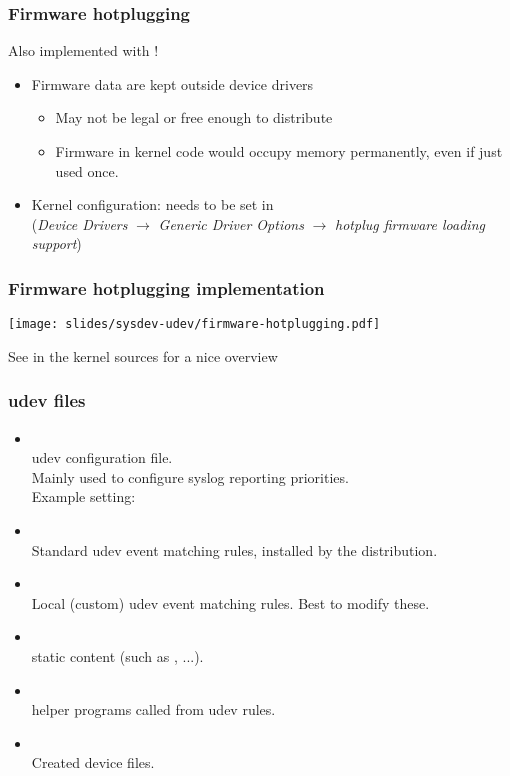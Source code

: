\begin{frame}
  \frametitle{Firmware hotplugging}
  Also implemented with !
  \begin{itemize}
  \item Firmware data are kept outside device drivers
    \begin{itemize}
    \item May not be legal or free enough to distribute
    \item Firmware in kernel code would occupy memory permanently,
      even if just used once.
    \end{itemize}
  \item Kernel configuration: needs to be set in \\
    ({\em Device Drivers} $\rightarrow$ {\em Generic Driver Options}
    $\rightarrow$ {\em hotplug firmware loading support})
  \end{itemize}
\end{frame}

\begin{frame}
  \frametitle{Firmware hotplugging implementation}
  \begin{center}
    \texttt{[image: slides/sysdev-udev/firmware-hotplugging.pdf]}
  \end{center}
  See  in the kernel sources for a
  nice overview
\end{frame}

\begin{frame}
  \frametitle{udev files}
  \begin{itemize}
  \item {}\\
    udev configuration file.\\
    Mainly used to configure syslog reporting priorities.\\
    Example setting: 
  \item {}\\
    Standard udev event matching rules, installed by the distribution.
  \item {}\\
    Local (custom) udev event matching rules. Best to modify these.
  \item {}\\
    static  content (such as ,
    ...).
  \item {}\\
    helper programs called from udev rules.
  \item {}\\
    Created device files.
  \end{itemize}
\end{frame}

